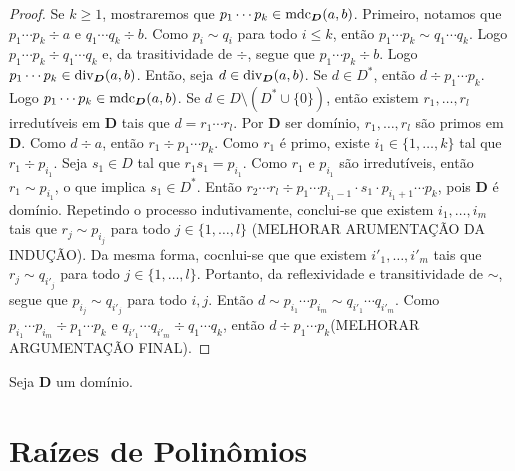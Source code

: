 \begin{proof}
	Se $k \geq 1$, mostraremos que $p_1 \cdots p_k \in \operatorname{mdc}_{\bm D}(a,b)$. Primeiro, notamos que $p_1 \cdots p_k \div a$ e $q_1 \cdots q_k \div b$. Como $p_i \sim q_i$ para todo $i \leq k$, então $p_1 \cdots p_k \sim q_1 \cdots q_k$. Logo $p_1 \cdots p_k \div q_1 \cdots q_k$ e, da trasitividade de $\div$, segue que $p_1 \cdots p_k \div b$. Logo $p_1 \cdots p_k \in \operatorname{div}_{\bm D}(a,b)$. Então, seja $d \in \operatorname{div}_{\bm D}(a,b)$. Se $d \in D^*$, então $d \div p_1 \cdots p_k$. Logo $p_1 \cdots p_k \in \operatorname{mdc}_{\bm D}(a,b)$. Se $d \in D \setminus (D^* \cup \{0\})$, então existem $r_1,\ldots,r_l$ irredutíveis em $\bm D$ tais que $d = r_1 \cdots r_l$. Por $\bm D$ ser domínio, $r_1,\ldots,r_l$ são primos em $\bm D$. Como $d \div a$, então $r_1 \div p_1 \cdots p_k$. Como $r_1$ é primo, existe $i_1 \in \{1,\ldots,k\}$ tal que $r_1 \div p_{i_1}$. Seja $s_1 \in D$ tal que $r_1s_1 = p_{i_1}$. Como $r_1$ e $p_{i_1}$ são irredutíveis, então $r_1 \sim p_{i_1}$, o que implica $s_1 \in D^*$. Então $r_2 \cdots r_l \div p_1 \cdots p_{i_1-1} \cdot s_1 \cdot p_{i_1+1} \cdots p_k$, pois $\bm D$ é domínio. Repetindo o processo indutivamente, conclui-se que existem $i_1, \ldots,i_m$ tais que $r_j \sim p_{i_j}$ para todo $j \in \{1,\ldots,l\}$ (MELHORAR ARUMENTAÇÃO DA INDUÇÃO). Da mesma forma, cocnlui-se que que existem $i'_1, \ldots,i'_m$ tais que $r_j \sim q_{i'_j}$ para todo $j \in \{1,\ldots,l\}$. Portanto, da reflexividade e transitividade de $\sim$, segue que $p_{i_j} \sim q_{i'_j}$ para todo $i,j$. Então $d \sim p_{i_1} \cdots p_{i_m} \sim q_{i'_1} \cdots q_{i'_m}$. Como $p_{i_1} \cdots p_{i_m} \div p_1 \cdots p_k$ e $q_{i'_1} \cdots q_{i'_m} \div q_1 \cdots q_k$, então $d \div p_1 \cdots p_k$(MELHORAR ARGUMENTAÇÃO FINAL).
\end{proof}

\begin{lema}
	Seja $\bm D$ um domínio.
\end{lema}

\section{Raízes de Polinômios}

